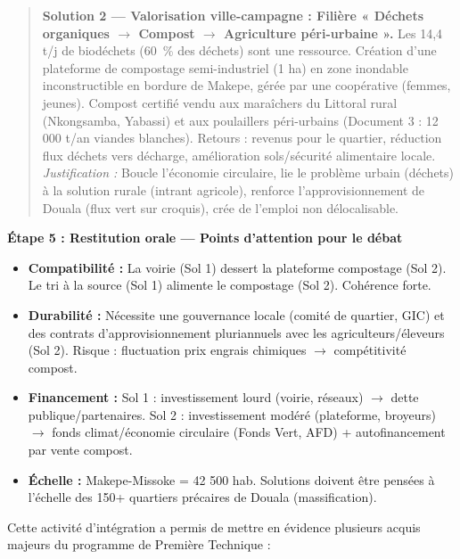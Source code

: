 \documentclass[11pt]{article}
\newcommand{\cle}[1]{{\popxbold\color{popdark}#1}}
\newcounter{popsec}
\newcounter{popsub}
\newcommand{\courssub}[1]{%
  \stepcounter{popsub}%
  \par\vspace{9pt}\noindent{\popxbold\fontsize{11.5}{13}\selectfont\color{popink}{\color{poporange}\thepopsec.\thepopsub}\hspace{6pt}#1}\par\nopagebreak\vspace{4pt}
}
\begin{document}
\begin{exoresolu}
\begin{quote}
\textbf{Solution 2 — Valorisation ville-campagne : Filière « \cle{Déchets organiques} $\rightarrow$ \cle{Compost} $\rightarrow$ \cle{Agriculture péri-urbaine} ».} Les 14,4 t/j de biodéchets (60~\% des déchets) sont une ressource. Création d'une plateforme de compostage semi-industriel (1 ha) en zone inondable inconstructible en bordure de Makepe, gérée par une coopérative (femmes, jeunes). Compost certifié vendu aux maraîchers du Littoral rural (Nkongsamba, Yabassi) et aux poulaillers péri-urbains (Document 3 : 12 000 t/an viandes blanches). Retours : revenus pour le quartier, réduction flux déchets vers décharge, amélioration sols/sécurité alimentaire locale. \emph{Justification :} Boucle l'\cle{économie circulaire}, lie le problème urbain (déchets) à la solution rurale (intrant agricole), renforce l'approvisionnement de Douala (flux vert sur croquis), crée de l'emploi non délocalisable.
\end{quote}

\textbf{Étape 5 : Restitution orale — Points d'attention pour le débat}
\begin{itemize}
    \item \textbf{Compatibilité :} La voirie (Sol 1) dessert la plateforme compostage (Sol 2). Le tri à la source (Sol 1) alimente le compostage (Sol 2). Cohérence forte.
    \item \textbf{Durabilité :} Nécessite une gouvernance locale (comité de quartier, GIC) et des contrats d'approvisionnement pluriannuels avec les agriculteurs/éleveurs (Sol 2). Risque : fluctuation prix engrais chimiques $\rightarrow$ compétitivité compost.
    \item \textbf{Financement :} Sol 1 : investissement lourd (voirie, réseaux) $\rightarrow$ dette publique/partenaires. Sol 2 : investissement modéré (plateforme, broyeurs) $\rightarrow$ fonds climat/\cle{économie circulaire} (Fonds Vert, AFD) + autofinancement par vente compost.
    \item \textbf{Échelle :} Makepe-Missoke = 42 500 hab. Solutions doivent être pensées à l'échelle des 150+ quartiers précaires de Douala (massification).
\end{itemize}
\end{exoresolu}

\courssub{Bilan de l'activité}
Cette activité d'intégration a permis de mettre en évidence plusieurs acquis majeurs du programme de Première Technique :
\end{document}
